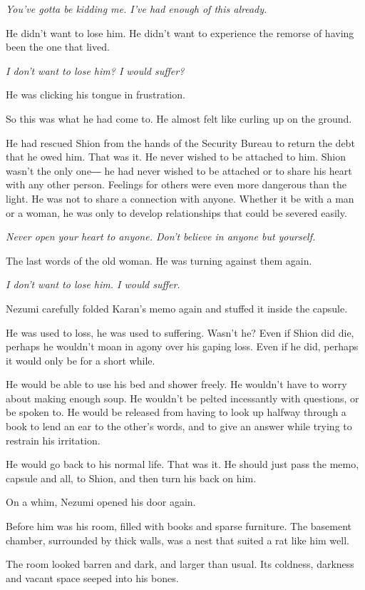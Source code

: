 \emph{You've gotta be kidding me. I've had enough of this already.}

He didn't want to lose him. He didn't want to experience the remorse of
having been the one that lived.

\emph{I don't want to lose him? I would suffer?}

He was clicking his tongue in frustration.

So this was what he had come to. He almost felt like curling up on the
ground.

He had rescued Shion from the hands of the Security Bureau to return the
debt that he owed him. That was it. He never wished to be attached to
him. Shion wasn't the only one― he had never wished to be attached or to
share his heart with any other person. Feelings for others were even
more dangerous than the light. He was not to share a connection with
anyone. Whether it be with a man or a woman, he was only to develop
relationships that could be severed easily.

\emph{Never open your heart to anyone. Don't believe in anyone but yourself.}

The last words of the old woman. He was turning against them again.

\emph{I don't want to lose him. I would suffer.}

Nezumi carefully folded Karan's memo again and stuffed it inside the
capsule.

He was used to loss, he was used to suffering. Wasn't he? Even if Shion
did die, perhaps he wouldn't moan in agony over his gaping loss. Even if
he did, perhaps it would only be for a short while.

He would be able to use his bed and shower freely. He wouldn't have to
worry about making enough soup. He wouldn't be pelted incessantly with
questions, or be spoken to. He would be released from having to look up
halfway through a book to lend an ear to the other's words, and to give
an answer while trying to restrain his irritation.

He would go back to his normal life. That was it. He should just pass
the memo, capsule and all, to Shion, and then turn his back on him.

On a whim, Nezumi opened his door again.

Before him was his room, filled with books and sparse furniture. The
basement chamber, surrounded by thick walls, was a nest that suited a
rat like him well.

The room looked barren and dark, and larger than usual. Its coldness,
darkness and vacant space seeped into his bones.

